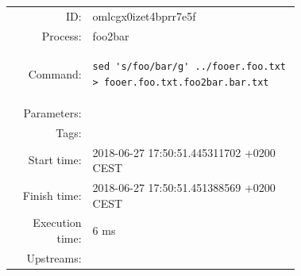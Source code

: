 \documentclass[11pt,oneside,openright]{memoir}
\begin{document}
    \begin{tcolorbox}[ title=foo2bar, 
                       colbacktitle=color2, 
                       colback=color2!50!white, 
                       coltitle=black ]
        \small
        \begin{tabular}{rp{0.72\linewidth}}
ID: & omlcgx0izet4bprr7e5f \\
Process: & foo2bar \\
Command: & \begin{lstlisting}
sed 's/foo/bar/g' ../fooer.foo.txt > fooer.foo.txt.foo2bar.bar.txt
\end{lstlisting} \\
Parameters:& \\
Tags: & \\
Start time: & 2018-06-27 17:50:51.445311702 +0200 CEST \\
Finish time: & 2018-06-27 17:50:51.451388569 +0200 CEST \\
Execution time: & 6 ms \\
Upstreams: & \\
        \end{tabular}
    \end{tcolorbox}
\end{document}

